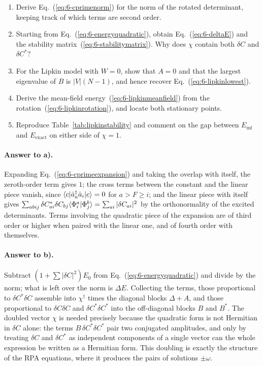 \begin{enumerate}
  \item[a)] Derive Eq.~(\ref{eq:6-cprimenorm}) for the norm of the rotated
  determinant, keeping track of which terms are second order.
  \item[b)] Starting from Eq.~(\ref{eq:6-energyquadratic}), obtain
  Eq.~(\ref{eq:6-deltaE}) and the stability
  matrix~(\ref{eq:6-stabilitymatrix}).  Why does $\chi$ contain both
  $\delta C$ and $\delta C^{*}$?
  \item[c)] For the Lipkin model with $W=0$, show that $A=0$ and that the
  largest eigenvalue of $B$ is $|V|(N-1)$, and hence recover
  Eq.~(\ref{eq:6-lipkinlowest}).
  \item[d)] Derive the mean-field energy~(\ref{eq:6-lipkinmeanfield}) from
  the rotation~(\ref{eq:6-lipkinrotation}), and locate both stationary
  points.
  \item[e)] Reproduce Table~\ref{tab:lipkinstability} and comment on the gap
  between $E_{\mathrm{mf}}$ and $E_{\mathrm{exact}}$ on either side of
  $\chi=1$.
\end{enumerate}

\paragraph{Answer to a).}
Expanding Eq.~(\ref{eq:6-cprimeexpansion}) and taking the overlap with
itself, the zeroth-order term gives $1$; the cross terms between the constant
and the linear piece vanish, since
$\langle c | \hat{a}^{\dagger}_a\hat{a}_i | c \rangle=0$ for $a>F\ge i$; and the
linear piece with itself gives
$\sum_{abij}\delta C^{*}_{ai}\delta C_{bj}\langle \Phi_i^a \vert \Phi_j^b \rangle
=\sum_{ai}|\delta C_{ai}|^2$ by the orthonormality of the excited
determinants.  Terms involving the quadratic piece of the expansion are of
third order or higher when paired with the linear one, and of fourth order
with themselves.

\paragraph{Answer to b).}
Subtract $(1+\sum|\delta C|^2)E_0$ from Eq.~(\ref{eq:6-energyquadratic}) and
divide by the norm; what is left over the norm is $\Delta E$.  Collecting the
terms, those proportional to $\delta C^{*}\delta C$ assemble into
$\chi^{\dagger}$ times the diagonal blocks $\Delta+A$, and those proportional
to $\delta C\delta C$ and $\delta C^{*}\delta C^{*}$ into the off-diagonal
blocks $B$ and $B^{*}$.  The doubled vector $\chi$ is needed precisely because
the quadratic form is not Hermitian in $\delta C$ alone: the terms
$B\,\delta C^{*}\delta C^{*}$ pair two conjugated amplitudes, and only by
treating $\delta C$ and $\delta C^{*}$ as independent components of a single
vector can the whole expression be written as a Hermitian form.  This doubling
is exactly the structure of the RPA equations, where it produces the pairs of
solutions $\pm\omega$.

